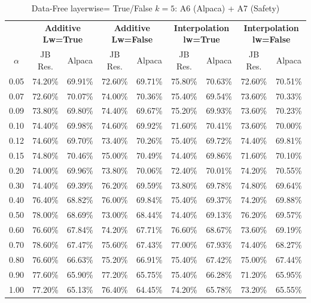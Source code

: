\begin{table}[h]
\centering
\caption{Data-Free layerwise= True/False $k=5$: A6 (Alpaca) + A7 (Safety)}
\label{tab:res_a6_data_free_5}
\begin{tabular}{c|cc|cc|cc|cc}
\hline
 & \multicolumn{2}{c|}{\textbf{Additive Lw=True}} & \multicolumn{2}{c|}{\textbf{Additive Lw=False}} & \multicolumn{2}{c|}{\textbf{Interpolation lw=True}}& \multicolumn{2}{c}{\textbf{Interpolation lw=False}} \\
$\alpha$ & JB Res. & Alpaca & JB Res. & Alpaca & JB Res. & Alpaca & JB Res. & Alpaca \\
\hline
0.05 & 74.20\% & 69.91\% & 72.60\% & 69.71\% & 75.80\% & 70.63\% & 72.60\% & 70.51\% \\
0.07 & 72.60\% & 70.07\% & 74.00\% & 70.36\% & 75.40\% & 69.54\% & 73.60\% & 70.33\% \\
0.09 & 73.80\% & 69.80\% & 74.40\% & 69.67\% & 75.20\% & 69.93\% & 73.60\% & 70.23\% \\
0.10 & 74.40\% & 69.98\% & 74.60\% & 69.92\% & 71.60\% & 70.41\% & 73.60\% & 70.00\% \\
0.12 & 74.60\% & 69.70\% & 73.40\% & 70.26\% & 75.40\% & 69.72\% & 74.40\% & 69.81\% \\
0.15 & 74.80\% & 70.46\% & 75.00\% & 70.49\% & 74.40\% & 69.86\% & 71.60\% & 70.10\% \\
0.20 & 74.00\% & 69.96\% & 73.80\% & 70.06\% & 72.40\% & 70.01\% & 74.20\% & 70.55\% \\
0.30 & 74.40\% & 69.39\% & 76.20\% & 69.59\% & 73.80\% & 69.78\% & 74.80\% & 69.64\% \\
0.40 & 76.40\% & 68.82\% & 76.00\% & 69.84\% & 75.40\% & 69.37\% & 74.20\% & 69.88\% \\
0.50 & 78.00\% & 68.69\% & 73.00\% & 68.44\% & 74.40\% & 69.13\% & 76.20\% & 69.57\% \\
0.60 & 76.60\% & 67.84\% & 74.20\% & 67.71\% & 76.60\% & 68.67\% & 73.60\% & 69.19\% \\
0.70 & 78.60\% & 67.47\% & 75.60\% & 67.43\% & 77.00\% & 67.93\% & 74.40\% & 68.27\% \\
0.80 & 76.60\% & 66.63\% & 75.20\% & 66.91\% & 75.40\% & 67.42\% & 75.00\% & 67.44\% \\
0.90 & 77.60\% & 65.90\% & 77.20\% & 65.75\% & 75.40\% & 66.28\% & 71.20\% & 65.95\% \\
1.00 & 77.20\% & 65.13\% & 76.40\% & 64.45\% & 74.20\% & 65.78\% & 73.20\% & 65.55\% \\
\hline
\end{tabular}
\end{table}
\FloatBarrier

